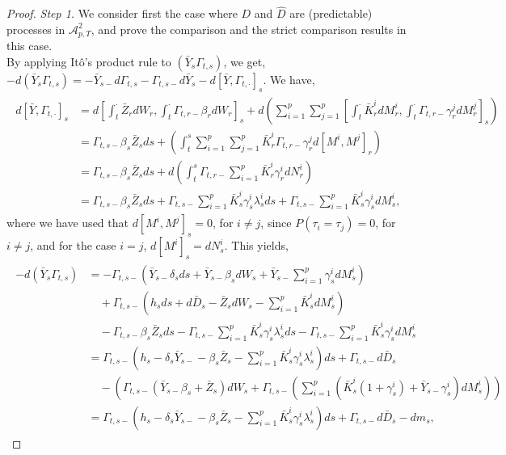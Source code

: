 \documentclass[11pt,a4paper]{article}
\numberwithin{equation}{section}
\theoremstyle{newPlain}
\theoremstyle{newDefinition}
\theoremstyle{newRemark}
\begin{document}
{\begin{proof}
\textit{Step 1. } We  consider first the case where  $D$ and $\hat{D}$ are (predictable)   processes in $\mathcal{A}_{p,T}^2$, and prove the comparison and the strict comparison results in this case.\\ 
By applying It\^o's product rule to $(\bar{Y}_s\Gamma_{t,s})$, we get, $-d(\bar{Y}_s\Gamma_{t,s})=-\bar{Y}_{s-}d\Gamma_{t,s} -\Gamma_{t,s-}d\bar{Y}_s - d[\bar{Y},\Gamma_{t,\cdot}]_s$. We have, 
\begin{align}\label{eq:proofCompThm2}
    \begin{aligned}
        d[\bar{Y},\Gamma_{t,\cdot}]_s&= d\left[\int_t^\cdot\bar{Z}_rdW_r,\int_t^\cdot\Gamma_{t,r-}\beta_rdW_r\right]_s + d\left(\sum_{i=1}^p\sum_{j=1}^p\left[\int_t^\cdot\bar{K}_r^idM_r^i,\int_t^\cdot\Gamma_{t,r-}\gamma_r^jdM_r^j\right]_s\right)\\
	&= \Gamma_{t,s-}\beta_s\bar{Z}_sds + \left(\int_t^s\sum_{i=1}^p\sum_{j=1}^p\bar{K}_r^i\Gamma_{t,r-}\gamma_r^jd[M^i,M^j]_r\right)\\
        &=\Gamma_{t,s-}\beta_s\bar{Z}_sds + d\left(\int_t^s\Gamma_{t,r-}\sum_{i=1}^p\bar{K}_r^i\gamma_r^idN_r^i\right)\\
        &= \Gamma_{t,s-}\beta_s\bar{Z}_sds + \Gamma_{t,s-}\sum_{i=1}^p\bar{K}_s^i\gamma_s^i\lambda_s^ids + \Gamma_{t,s-}\sum_{i=1}^p\bar{K}_s^i\gamma_s^idM_s^i,
    \end{aligned}
\end{align}
where we have used that $d[M^i,M^j]_s = 0$, for $i\ne j$, since $P(\tau_i = \tau_j)=0$, for $i\ne j$, and for the case $i=j$,  $d[M^i]_s =  dN_s^i$. This yields,
\begin{align}\label{eq:proofCompThm3}
    \begin{aligned}
        -d(\bar{Y}_s\Gamma_{t,s}) &= -\Gamma_{t,s-}\left(\bar{Y}_{s-}\delta_sds + \bar{Y}_{s-}\beta_sdW_s + \bar{Y}_{s-}\sum_{i=1}^p\gamma_s^idM_s^i\right) \\&\quad+ \Gamma_{t,s-}\left(h_sds + d\bar{D}_s - \bar{Z}_sdW_s - \sum_{i=1}^p\bar{K}_s^idM_s^i\right)\\&\quad-\Gamma_{t,s-}\beta_s\bar{Z}_sds -\Gamma_{t,s-}\sum_{i=1}^p\bar{K}_s^i\gamma_s^i\lambda_s^ids -\Gamma_{t,s-}\sum_{i=1}^p\bar{K}_s^i\gamma_s^idM_s^i\\
        &=\Gamma_{t,s-}\left(h_s-\delta_s\bar{Y}_{s-} - \beta_s\bar{Z}_s-\sum_{i=1}^p\bar{K}_s^i\gamma_s^i\lambda_s^i\right)ds + \Gamma_{t,s-}d\bar{D}_s\\&\quad-\left(\Gamma_{t,s-}(\bar{Y}_{s-}\beta_s+\bar{Z}_s)dW_s + \Gamma_{t,s-}\left(\sum_{i=1}^p(\bar{K}_s^i(1+\gamma_s^i)+\bar{Y}_{s-}\gamma_s^i)dM_s^i\right)\right)\\
        &=\Gamma_{t,s-}\left(h_s-\delta_s\bar{Y}_{s-} - \beta_s\bar{Z}_s-\sum_{i=1}^p\bar{K}_s^i\gamma_s^i\lambda_s^i\right)ds + \Gamma_{t,s-}d\bar{D}_s-dm_s,
    \end{aligned}
\end{align}


\end{proof}}
\end{document}
